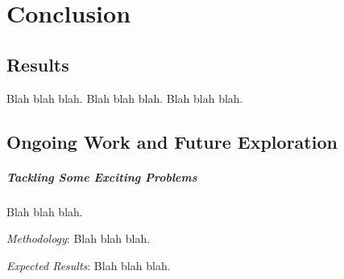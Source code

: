 \chapter{Conclusion}
\label{chap:conclusion}
\section{Results}
Blah blah blah. Blah blah blah. Blah blah blah.

\section{Ongoing Work and Future Exploration}
\paragraph*{Tackling Some Exciting Problems}

Blah blah blah.

\textit{Methodology}: Blah blah blah.
    
\textit{Expected Results}: Blah blah blah.
